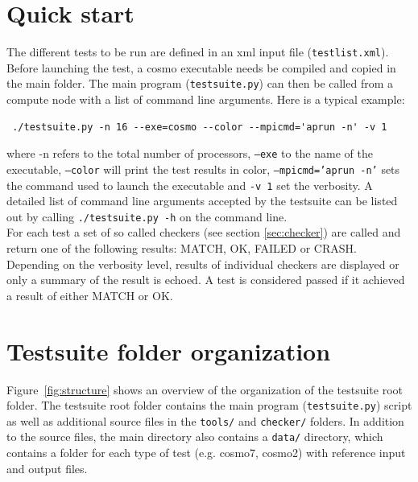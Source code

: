 \documentclass[12pt,twoside,a4paper]{report}
\begin{document}
\section{Quick start}

The different tests to be run are defined in an xml input file (\texttt{testlist.xml}). Before launching the test, a cosmo executable needs be compiled and copied in the main folder. The main program (\texttt{testsuite.py}) can then be called from a compute node with a list of command line arguments. Here is a typical example:
\begin{verbatim}
 ./testsuite.py -n 16 --exe=cosmo --color --mpicmd='aprun -n' -v 1
\end{verbatim}
where -n refers to the total number of processors, \texttt{--exe} to the name of the executable, \texttt{--color} will print the test results in color, \texttt{--mpicmd='aprun -n'} sets the command used to launch the executable and \texttt{-v 1} set the verbosity. A detailed list of command line arguments accepted by the testsuite can be listed out by calling \texttt{./testsuite.py -h} on the command line.\\
For each test a set of so called checkers (see section \ref{sec:checker}) are called and return one of the following results: MATCH, OK, FAILED or CRASH. Depending on the verbosity level, results of individual checkers are displayed or only a summary of the result is echoed. A test is considered passed if it achieved a result of either MATCH or OK.

\section{Testsuite folder organization}

Figure~\ref{fig:structure} shows an overview of the organization of the testsuite root folder. The testsuite root folder contains the main program (\texttt{testsuite.py}) script as well as additional source files in the \texttt{tools/} and \texttt{checker/} folders. In addition to the source files, the main directory also contains a \texttt{data/} directory, which contains a folder for each type of test (e.g. cosmo7, cosmo2) with reference input and output files.\\
\end{document}
